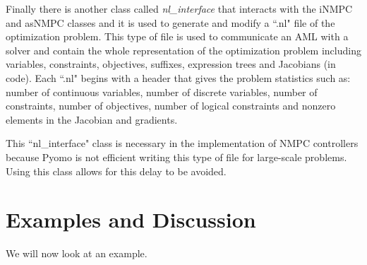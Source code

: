 \documentclass{article}
\begin{document}
Finally there is another class called \textit{nl\_interface} that interacts with the iNMPC and asNMPC classes and it is used to generate and modify a ``.nl" file of the optimization problem.
This type of file is used to communicate an AML with a solver and contain the whole representation of the optimization problem including variables, constraints, objectives, suffixes, expression trees and Jacobians (in code).
Each ``.nl" begins with a header that gives the problem statistics such as:
number of continuous variables, number of  discrete variables, number of constraints, number of objectives, number of logical constraints and nonzero elements in the Jacobian and gradients.
\par
This ``nl\_interface" class is necessary in the implementation of NMPC controllers because Pyomo is not efficient writing this type of file for large-scale problems.
Using this class allows for this delay to be avoided.
\section{Examples and Discussion}
We will now look at an example.
\end{document}
